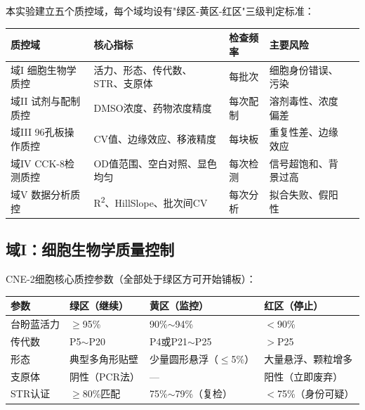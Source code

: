 \documentclass[12pt,a4paper]{article}
\begin{document}
本实验建立五个质控域，每个域均设有"绿区-黄区-红区"三级判定标准：

\begin{center}
\begin{tabular}{lllll}
\toprule
\rowcolor{tabheadbg}\color{white}\textbf{质控域} & \color{white}\textbf{核心指标} & \color{white}\textbf{检查频率} & \color{white}\textbf{主要风险} \\
\midrule
域I 细胞生物学质控 & 活力、形态、传代数、STR、支原体 & 每批次 & 细胞身份错误、污染 \\
域II 试剂与配制质控 & DMSO浓度、药物浓度精度 & 每次配制 & 溶剂毒性、浓度偏差 \\
域III 96孔板操作质控 & CV值、边缘效应、移液精度 & 每块板 & 重复性差、边缘效应 \\
域IV CCK-8检测质控 & OD值范围、空白对照、显色均匀 & 每次检测 & 信号超饱和、背景过高 \\
域V 数据分析质控 & R\textsuperscript{2}、HillSlope、批次间CV & 每次分析 & 拟合失败、假阳性 \\
\bottomrule
\end{tabular}
\end{center}

\subsection{域I：细胞生物学质量控制}

CNE-2细胞核心质控参数（全部处于绿区方可开始铺板）：

\begin{center}
\begin{tabular}{llll}
\toprule
\rowcolor{tabheadbg}\color{white}\textbf{参数} & \color{white}\textbf{绿区（继续）} & \color{white}\textbf{黄区（监控）} & \color{white}\textbf{红区（停止）} \\
\midrule
台盼蓝活力 & $\geq$95\% & 90\%$\sim$94\% & $<$90\% \\
传代数 & P5$\sim$P20 & P4或P21$\sim$P25 & $>$P25 \\
形态 & 典型多角形贴壁 & 少量圆形悬浮（$\leq$5\%）& 大量悬浮、颗粒增多 \\
支原体 & 阴性（PCR法）& — & 阳性（立即废弃）\\
STR认证 & $\geq$80\%匹配 & 75\%$\sim$79\%（复检）& $<$75\%（身份可疑）\\
\bottomrule
\end{tabular}
\end{center}
\end{document}
